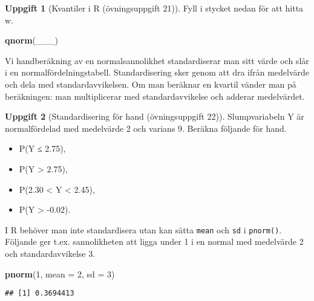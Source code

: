 \documentclass[
]{book}
\newenvironment{Shaded}{\begin{snugshade}}{\end{snugshade}}
\newcommand{\AttributeTok}[1]{\textcolor[rgb]{0.13,0.29,0.53}{#1}}
\newcommand{\DecValTok}[1]{\textcolor[rgb]{0.00,0.00,0.81}{#1}}
\newcommand{\FunctionTok}[1]{\textcolor[rgb]{0.13,0.29,0.53}{\textbf{#1}}}
\newcommand{\NormalTok}[1]{#1}
\providecommand{\tightlist}{%
  \setlength{\itemsep}{0pt}\setlength{\parskip}{0pt}}
\theoremstyle{definition}
\theoremstyle{definition}
\theoremstyle{definition}
\newtheorem{exercise}{Uppgift}[chapter]
\theoremstyle{definition}
\theoremstyle{remark}
\begin{document}
\begin{exercise}[Kvantiler i R (övningsuppgift 21)]

Fyll i stycket nedan för att hitta w.

\begin{Shaded}
\begin{Highlighting}[]
\FunctionTok{qnorm}\NormalTok{(\_\_\_)}
\end{Highlighting}
\end{Shaded}

\end{exercise}

Vi handberäkning av en normalsannolikhet standardiserar man sitt värde och slår i en normalfördelningstabell.
Standardisering sker genom att dra ifrån medelvärde och dela med standardavvikelsen.
Om man beräknar en kvartil vänder man på beräkningen: man multiplicerar med standardavvikelse och adderar medelvärdet.

\begin{exercise}[Standardisering för hand (övningsuppgift 22)]

Slumpvariabeln Y är normalfördelad med medelvärde 2 och varians 9. Beräkna följande för hand.

\begin{itemize}
\tightlist
\item
  P(Y ≤ 2.75),
\item
  P(Y \textgreater{} 2.75),
\item
  P(2.30 \textless{} Y \textless{} 2.45),
\item
  P(Y \textgreater{} -0.02).
\end{itemize}

\end{exercise}

I R behöver man inte standardisera utan kan sätta \texttt{mean} och \texttt{sd} i \texttt{pnorm()}. Följande ger t.ex. sannolikheten att ligga under 1 i en normal med medelvärde 2 och standardavvikelse 3.

\begin{Shaded}
\begin{Highlighting}[]
\FunctionTok{pnorm}\NormalTok{(}\DecValTok{1}\NormalTok{, }\AttributeTok{mean =} \DecValTok{2}\NormalTok{, }\AttributeTok{sd =} \DecValTok{3}\NormalTok{)}
\end{Highlighting}
\end{Shaded}

\begin{verbatim}
## [1] 0.3694413
\end{verbatim}
\end{document}
